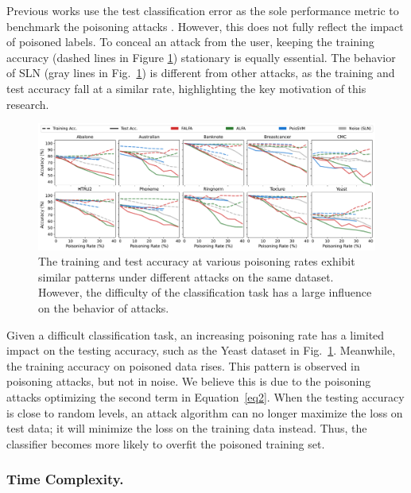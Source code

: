 \documentclass[runningheads]{llncs}
\begin{document}
Previous works use the test classification error as the sole performance metric to benchmark the poisoning attacks \cite{ho2002complexity,koh2022stronger,paudice2018label}.
However, this does not fully reflect the impact of poisoned labels.
To conceal an attack from the user, keeping the training accuracy (dashed lines in Figure \ref{fig.real_acc}) stationary is equally essential.
The behavior of SLN (gray lines in Fig.~\ref{fig.real_acc}) is different from other attacks, as the training and test accuracy fall at a similar rate, highlighting the key motivation of this research.

\begin{figure}[ht!]
    \centering
    \includegraphics[width=\columnwidth]{images/flfa_acc_all.pdf}
    \caption[Training and Test Accuracy Under Poisoning Attacks]{
        The training and test accuracy at various poisoning rates exhibit similar patterns under different attacks on the same dataset. However, the difficulty of the classification task has a large influence on the behavior of attacks.
    }
    \label{fig.real_acc}
\end{figure}

Given a difficult classification task,
an increasing poisoning rate has a limited impact on the testing accuracy, such as the Yeast dataset in Fig.~\ref{fig.real_acc}.
Meanwhile, the training accuracy on poisoned data rises.
This pattern is observed in poisoning attacks, but not in noise.
We believe this is due to the poisoning attacks optimizing the second term in Equation~\ref{eq2}.
When the testing accuracy is close to random levels, an attack algorithm can no longer maximize the loss on test data; it will minimize the loss on the training data instead.
Thus, the classifier becomes more likely to overfit the poisoned training set.



\subsubsection{Time Complexity.\xspace}
\end{document}
